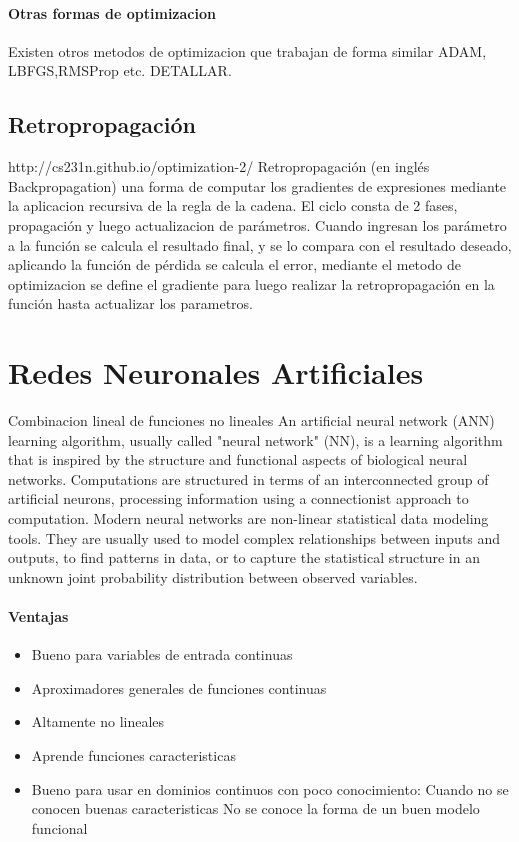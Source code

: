 \documentclass[a4paper,12pt,spanish]{book}
\begin{document}
      \paragraph{Otras formas de optimizacion}
	Existen otros metodos de optimizacion que trabajan de forma similar ADAM, LBFGS,RMSProp etc. DETALLAR.
	
    \subsection{Retropropagación}
      http://cs231n.github.io/optimization-2/
      Retropropagación (en inglés Backpropagation) una forma  de computar los gradientes de expresiones mediante la aplicacion recursiva de la regla de la cadena.
      El ciclo consta de 2 fases, propagación y luego actualizacion de parámetros. Cuando ingresan los parámetro a la función se calcula el resultado final, y se lo compara con el resultado 
      deseado, aplicando la función de pérdida se calcula el error, mediante el metodo de optimizacion se define el gradiente para luego realizar la retropropagación en la función hasta 
      actualizar los parametros.

    \section{Redes Neuronales Artificiales}
      Combinacion lineal de funciones no lineales
      An artificial neural network (ANN) learning algorithm, usually called "neural network" (NN), is a learning algorithm that is inspired by the structure and functional aspects 
      of biological neural networks. Computations are structured in terms of an interconnected group of artificial neurons, processing information using a connectionist approach 
      to computation. Modern neural networks are non-linear statistical data modeling tools. They are usually used to model complex relationships between inputs and outputs, 
      to find patterns in data, or to capture the statistical structure in an unknown joint probability distribution between observed variables.
      \paragraph {Ventajas}
	\begin{itemize}
	  \item Bueno para variables de entrada continuas
	  \item Aproximadores generales de funciones continuas
	  \item Altamente no lineales
	  \item Aprende funciones caracteristicas
	  \item Bueno para usar en dominios continuos con poco conocimiento:
	    \subitem Cuando no se conocen buenas caracteristicas
	    \subitem No se conoce la forma de un buen modelo funcional
	\end{itemize}
\end{document}
